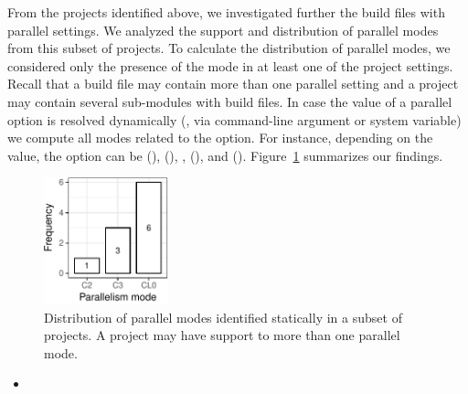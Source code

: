  From the \numProjectsPar{} projects
identified above, we investigated further the \numPomMatched{}
build files with parallel settings.  We analyzed the support and
distribution of parallel modes from this subset of projects. To
calculate the distribution of parallel modes, we considered only the
presence of the mode in at least one of the project settings.  Recall
that a build file may contain more than one parallel setting and a
project may contain several sub-modules with build files.  In case the
value of a parallel option is resolved dynamically (\eg, via
command-line argument or system variable) we compute all modes related
to the option. For instance, depending on the value, the
 option can be \Seq{} (),
\ParClassSeqMeth{} (), \SeqClassParMeth{},
(), and \ParClassParMeth{} ().
Figure~\ref{fig:freqmodes-static} summarizes our findings.

\begin{figure}[h!]
    \centering
    \includegraphics[width=0.32\textwidth]{plots/barplot-modes-static.pdf}
	\caption{\label{fig:freqmodes-static}Distribution of parallel modes
    identified statically in a subset of \numProjectsPar{} projects.
    A project may have support to more than one parallel mode.}
\end{figure}

\begin{center}
\end{center}

\begin{itemize}
	\item \textbf{\RQE{}}
\end{itemize}

